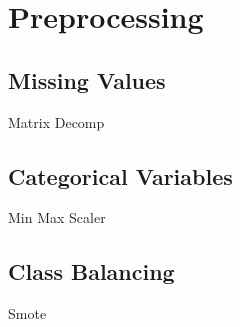 \section{Preprocessing}

\subsection{Missing Values}


Matrix Decomp \\


\subsection{Categorical Variables}

Min Max Scaler

\subsection{Class Balancing}

Smote 